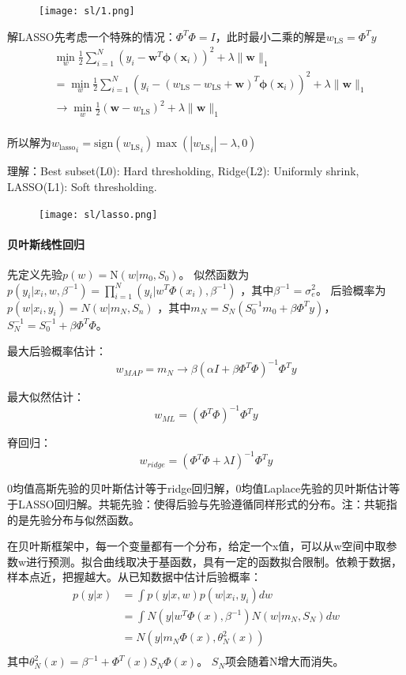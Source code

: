 \begin{figure}[H]
\centering
\texttt{[image: sl/1.png]}
\end{figure}


解LASSO先考虑一个特殊的情况：$\Phi^T\Phi = I$，此时最小二乘的解是$w_\mathrm{LS} = \Phi^Ty$
\begin{equation}
\begin{aligned}
    &\min_w \frac{1}{2}\sum^N_{i=1}(y_i - \bm w^T\bm\phi(\bm x_i))^2 + \lambda\|\bm w\|_1 \\
    &=\! \min_w \frac{1}{2}\sum^N_{i=1}(y_i\! - (w_\mathrm{LS}\! - w_\mathrm{LS}\! +\! \bm w)^T\bm\phi(\bm x_i))^2\! +\! \lambda\|\bm w\|_1 \\
    &\to \min_w \frac{1}{2}(\bm w - w_\mathrm{LS})^2 + \lambda\|\bm w\|_1 \\
\end{aligned} 
\end{equation}

所以解为${w_\mathrm{lasso}}_i = \mathrm{sign}({w_\mathrm{LS}}_i) \max (|{w_\mathrm{LS}}_i| - \lambda, 0)$

理解：Best subset(L0): Hard thresholding,
Ridge(L2): Uniformly shrink,
LASSO(L1): Soft thresholding.

\begin{figure}[H]
\centering
\texttt{[image: sl/lasso.png]}
\end{figure}

\paragraph{贝叶斯线性回归} 
先定义先验$p(w) = \mathrm{N}(w|m_0, S_0)$。
似然函数为$p(y_i|x_i,w,\beta^{-1}) = \prod_{i=1}^{N}(y_i|w^T\Phi(x_i),\beta^{-1})$
，其中$\beta^{-1}=\sigma_e^2$。
后验概率为$p(w|x_i,y_i)=N(w|m_N,S_n)$
，其中$m_N=S_N(S_0^{-1}m_0+\beta\Phi^Ty)$，
$S_N^{-1}=S_0^{-1}+\beta\Phi^T\Phi$。

最大后验概率估计：$$w_{MAP}=m_N \to \beta(\alpha I+\beta \Phi^T\Phi)^{-1}\Phi^Ty$$

最大似然估计：
$$w_{ML}=(\Phi^T\Phi)^{-1}\Phi^Ty$$

脊回归：
$$w_{ridge}=(\Phi^T\Phi+\lambda I)^{-1}\Phi^Ty$$

0均值高斯先验的贝叶斯估计等于ridge回归解，0均值Laplace先验的贝叶斯估计等于LASSO回归解。共轭先验：使得后验与先验遵循同样形式的分布。注：共轭指的是先验分布与似然函数。

在贝叶斯框架中，每一个变量都有一个分布，给定一个x值，可以从w空间中取参数w进行预测。拟合曲线取决于基函数，具有一定的函数拟合限制。依赖于数据，样本点近，把握越大。从已知数据中估计后验概率：
$$
\begin{aligned}
    p(y|x) &=\int p(y|x,w)p(w|x_i,y_i)dw \\
    &=\int N(y|w^T\Phi(x),\beta^{-1})N(w|m_N,S_N)dw \\
    &=N(y|m_N\Phi(x),\theta_N^2(x)) \\
\end{aligned}
$$
其中$\theta_N^2(x)=\beta^{-1}+\Phi^T(x)S_N\Phi(x)$。 $S_N$项会随着N增大而消失。


